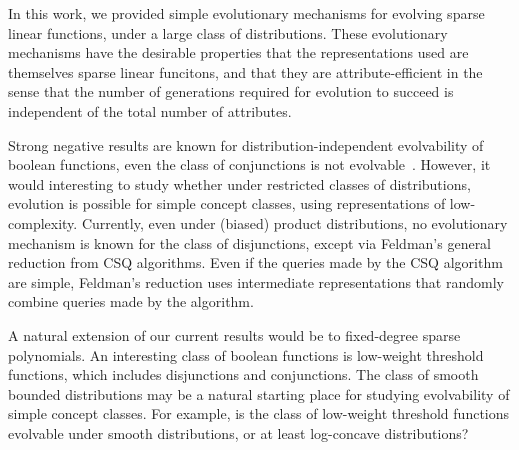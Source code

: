 In this work, we provided simple evolutionary mechanisms for evolving sparse
linear functions, under a large class of distributions. These evolutionary
mechanisms have the desirable properties that the representations used are
themselves sparse linear funcitons, and that they are attribute-efficient in the
sense that the number of generations required for evolution to succeed is
independent of the total number of attributes.

Strong negative results are known for distribution-independent evolvability of
boolean functions, \eg even the class of conjunctions is not
evolvable~\cite{Feldman:2011-LTF}.  However, it would interesting to study
whether under restricted classes of distributions, evolution is possible for
simple concept classes, using representations of low-complexity. Currently, even
under (biased) product distributions, no evolutionary mechanism is known for the
class of disjunctions, except via Feldman's general reduction from CSQ
algorithms. Even if the queries made by the CSQ algorithm are simple, Feldman's
reduction uses intermediate representations that randomly combine queries made
by the algorithm. 

A natural extension of our current results would be to fixed-degree sparse
polynomials. An interesting class of boolean functions is low-weight threshold
functions, which includes disjunctions and conjunctions.  The class of smooth
bounded distributions may be a natural starting place for studying evolvability
of simple concept classes. For example, is the class of low-weight threshold
functions evolvable under smooth distributions, or at least log-concave
distributions? 
